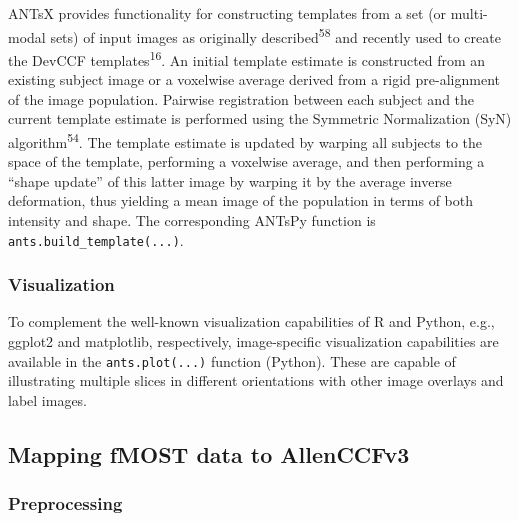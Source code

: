 \documentclass[
  12pt,
]{article}
\begin{document}
ANTsX provides functionality for constructing templates from a set (or
multi-modal sets) of input images as originally
described\textsuperscript{58} and recently used to create the DevCCF
templates\textsuperscript{16}. An initial template estimate is
constructed from an existing subject image or a voxelwise average
derived from a rigid pre-alignment of the image population. Pairwise
registration between each subject and the current template estimate is
performed using the Symmetric Normalization (SyN)
algorithm\textsuperscript{54}. The template estimate is updated by
warping all subjects to the space of the template, performing a
voxelwise average, and then performing a ``shape update'' of this latter
image by warping it by the average inverse deformation, thus yielding a
mean image of the population in terms of both intensity and shape. The
corresponding ANTsPy function is \texttt{ants.build\_template(...)}.

\subsubsection{Visualization}\label{visualization}

To complement the well-known visualization capabilities of R and Python,
e.g., ggplot2 and matplotlib, respectively, image-specific visualization
capabilities are available in the \texttt{ants.plot(...)} function
(Python). These are capable of illustrating multiple slices in different
orientations with other image overlays and label images.

\subsection{Mapping fMOST data to
AllenCCFv3}\label{mapping-fmost-data-to-allenccfv3}

\subsubsection{Preprocessing}\label{preprocessing}
\end{document}
